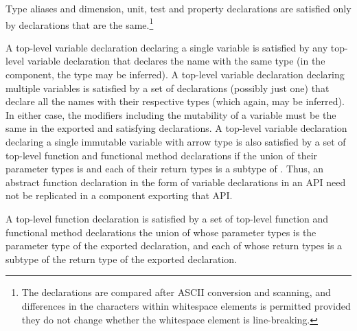 Type aliases and dimension, unit, test and property declarations
are satisfied only by declarations that are the same.\footnote{The
declarations are compared after ASCII conversion and scanning,
and differences in the characters within whitespace elements
is permitted
provided they do not change whether the whitespace element
is line-breaking.
}

A top-level variable declaration declaring a single variable
is satisfied by any top-level variable declaration
that declares the name with the same type
(in the component,
the type may be inferred).
A top-level variable declaration declaring multiple variables
is satisfied by a set of declarations (possibly just one)
that declare all the names with their respective types
(which again, may be inferred).
In either case,
the modifiers including the mutability of a variable must be the same in
the exported and satisfying declarations.
A top-level variable declaration
declaring a single immutable variable
with arrow type 
is also satisfied
by a set of top-level function and functional method declarations
if the union of their parameter types is 
and each of their return types is a subtype of .
Thus, an abstract function declaration
in the form of variable declarations in an API
need not be replicated in a component exporting that API.

A top-level function declaration is satisfied by
a set of top-level function and functional method declarations
the union of whose parameter types
is the parameter type of the exported declaration,
and each of whose return types
is a subtype of the return type of the exported declaration.

